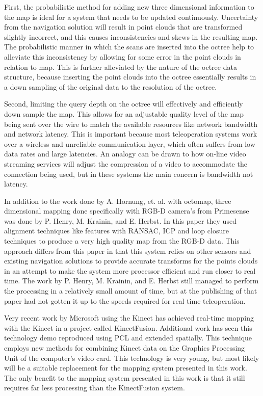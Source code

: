 \documentclass[12pt]{report}
\begin{document}
First, the probabilistic method for adding new three dimensional information to the map is ideal for a system that needs to be updated continuously.  Uncertainty from the navigation solution will result in point clouds that are transformed slightly incorrect, and this causes inconsistencies and skews in the resulting map. The probabilistic manner in which the scans are inserted into the octree help to alleviate this inconsistency by allowing for some error in the point clouds in relation to map. This is further alleviated by the nature of the octree data structure, because inserting the point clouds into the octree essentially results in a down sampling of the original data to the resolution of the octree.

Second, limiting the query depth on the octree will effectively and efficiently down sample the map.  This allows for an adjustable quality level of the map being sent over the wire to match the available resources like network bandwidth and network latency.  This is important because most teleoperation systems work over a wireless and unreliable communication layer, which often suffers from low data rates and large latencies.  An analogy can be drawn to how on-line video streaming services will adjust the compression of a video to accommodate the connection being used, but in these systems the main concern is bandwidth not latency.

In addition to the work done by A. Hornung, et. al. with octomap, three dimensional mapping done specifically with RGB-D camera's from Primesense was done by P. Henry, M. Krainin, and E. Herbst.\cite{Henry2010}  In this paper they used alignment techniques like features with RANSAC, ICP and loop closure techniques to produce a very high quality map from the RGB-D data.\cite{Henry2010}  This approach differs from this paper in that this system relies on other sensors and existing navigation solutions to provide accurate transforms for the points clouds in an attempt to make the system more processor efficient and run closer to real time.  The work by P. Henry, M. Krainin, and E. Herbst still managed to perform the processing in a relatively small amount of time, but at the publishing of that paper had not gotten it up to the speeds required for real time teleoperation.

Very recent work by Microsoft using the Kinect has achieved real-time mapping with the Kinect in a project called KinectFusion\cite{izadi2011kinectfusion}.  Additional work has seen this technology demo reproduced using PCL and extended spatially\cite{whelankintinuous}.  This technique employs new methods for combining Kinect data on the Graphics Processing Unit of the computer's video card.  This technology is very young, but most likely will be a suitable replacement for the mapping system presented in this work.  The only benefit to the mapping system presented in this work is that it still requires far less processing than the KinectFusion system.
\end{document}
